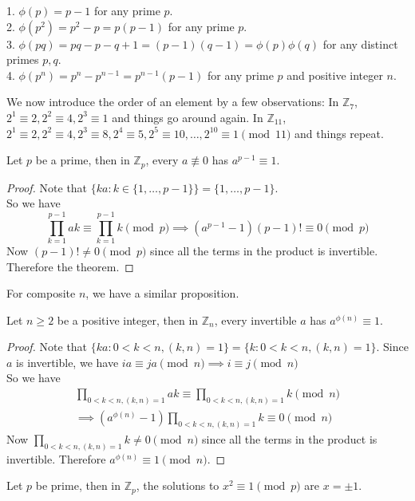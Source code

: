 \begin{example}
    1. $\phi(p)=p-1$ for any prime $p$.\\
    2. $\phi(p^2)=p^2-p=p(p-1)$ for any prime $p$.\\
    3. $\phi(pq)=pq-p-q+1=(p-1)(q-1)=\phi(p)\phi(q)$ for any distinct primes $p,q$.\\
    4. $\phi(p^n)=p^n-p^{n-1}=p^{n-1}(p-1)$ for any prime $p$ and positive integer $n$.
\end{example}
We now introduce the order of an element by a few observations:
In $\mathbb Z_7$, $2^1\equiv 2, 2^2\equiv 4, 2^3\equiv 1$ and things go around again.
In $\mathbb Z_{11}$, $2^1\equiv 2, 2^2\equiv 4, 2^3\equiv 8, 2^4\equiv 5, 2^5\equiv 10, \ldots, 2^{10}\equiv 1\pmod 11$ and things repeat.
\begin{theorem}
    Let $p$ be a prime, then in $\mathbb Z_p$, every $a\not\equiv 0$ has $a^{p-1}\equiv 1$.
\end{theorem}
\begin{proof}
    Note that $\{ka:k\in\{1,\ldots,p-1\}\}=\{1,\ldots,p-1\}$.\\
    So we have
    $$\prod_{k=1}^{p-1}ak\equiv\prod_{k=1}^{p-1}k\pmod{p}\implies (a^{p-1}-1)(p-1)!\equiv 0\pmod{p}$$
    Now $(p-1)!\neq 0\pmod{p}$ since all the terms in the product is invertible.
    Therefore the theorem.
\end{proof}
For composite $n$, we have a similar proposition.
\begin{theorem}
    Let $n\ge 2$ be a positive integer, then in $\mathbb Z_n$, every invertible $a$ has $a^{\phi(n)}\equiv 1$.
\end{theorem}
\begin{proof}
    Note that $\{ka:0<k<n,(k,n)=1\}=\{k:0<k<n,(k,n)=1\}$.
    Since $a$ is invertible, we have $ia\equiv ja\pmod{n}\implies i\equiv j\pmod{n}$\\
    So we have
    \begin{align*}
        \prod_{0<k<n,(k,n)=1}ak\equiv\prod_{0<k<n,(k,n)=1}k\pmod{n}\\
        \implies(a^{\phi(n)}-1)\prod_{0<k<n,(k,n)=1}k\equiv 0\pmod{n}
    \end{align*}
    Now $\prod_{0<k<n,(k,n)=1}k\neq 0\pmod{n}$ since all the terms in the product is invertible.
    Therefore $a^{\phi(n)}\equiv 1\pmod{n}$.
\end{proof}
\begin{lemma}
    Let $p$ be prime, then in $\mathbb Z_p$, the solutions to $x^2\equiv 1\pmod{p}$ are $x=\pm 1$.
\end{lemma}
